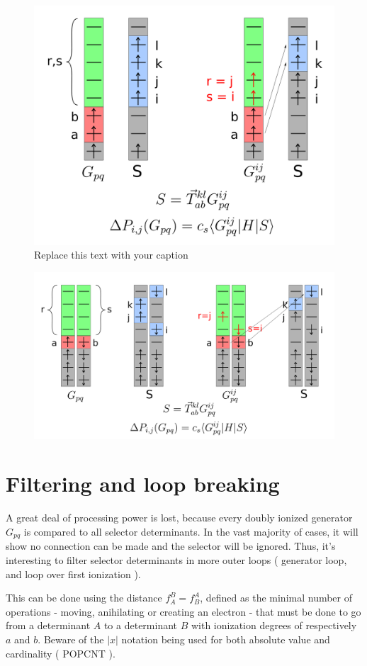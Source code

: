\begin{figure}[h!]
	\begin{center}
		\includegraphics[width=0.70\columnwidth]{figures/cipsi/systematic_determination}
		\caption{{Replace this text with your caption%
		}}
	\end{center}
\end{figure}
\begin{figure}[h!]
	\begin{center}
		\includegraphics[width=0.70\columnwidth]{figures/cipsi/systematic_determination2}
		\caption{{\label{splash}%
		}}
	\end{center}
\end{figure}

\section{Filtering and loop breaking}
A great deal of processing power is lost, because every doubly ionized generator $G_{pq}$ is compared to all selector determinants. In the vast majority of cases, it will show no connection can be made and the selector will be ignored. Thus, it's interesting to filter selector determinants in more outer loops ( generator loop, and loop over first ionization ).

This can be done using the distance $f_A^B = f_B^A$, defined as the minimal number of operations - moving, anihilating or creating an electron - that must be done to go from a determinant $A$ to a determinant $B$ with ionization degrees of respectively $a$ and $b$. Beware of the $|x|$ notation being used for both absolute value and cardinality ( POPCNT ).

